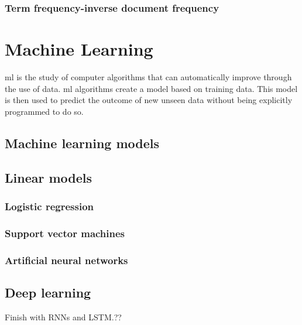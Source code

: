 \subsubsection{Term frequency-inverse document frequency}
\label{sec:tf-idf}


\section{Machine Learning}
\label{sec:machine-learning}
\acrfull{ml} is the study of computer algorithms that can automatically improve through the use of data. \acrshort{ml} algorithms create a model based on training data. This model is then used to predict the outcome of new unseen data without being explicitly programmed to do so.

\subsection{Machine learning models}
\label{sec:machine-learning-models}

\subsection{Linear models}
\label{sec:linear-models}

\subsubsection{Logistic regression}
\label{sec:logistic-regression}

\subsubsection{Support vector machines}
\label{sec:support-vector-machines}

\subsubsection{Artificial neural networks}
\label{sec:artificial-neural-networks}

\subsection{Deep learning}
\label{sec:deep-learning}


Finish with RNNs and LSTM.??

